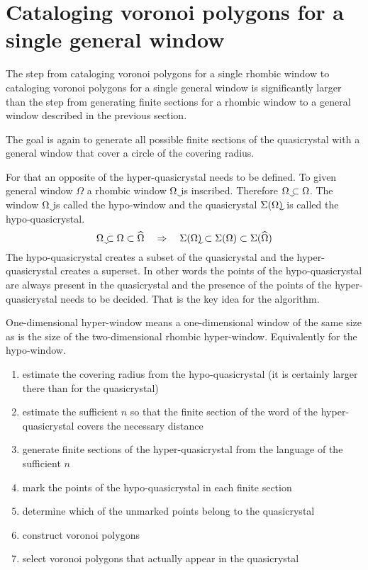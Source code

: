 \documentclass[text.tex]{subfiles}
\begin{document}
\section{Cataloging voronoi polygons for a single general window}
The step from cataloging voronoi polygons for a single rhombic window to cataloging voronoi polygons for a single general window is significantly larger than the step from generating finite sections for a rhombic window to a general window described in the previous section. 

The goal is again to generate all possible finite sections of the quasicrystal with a general window that cover a circle of the covering radius. 

For that an opposite of the hyper-quasicrystal needs to be defined. To given general window $\Omega$ a rhombic window $\uwidehat{\Omega}$ is inscribed. Therefore $\uwidehat{\Omega}\subset\Omega$. The window $\uwidehat{\Omega}$ is called the hypo-window and the quasicrystal $\quasi{\uwidehat{\Omega}}$ is called the hypo-quasicrystal. 
$$\uwidehat{\Omega}\subset\Omega\subset\widehat{\Omega} \quad \Rightarrow \quad \quasi{\uwidehat{\Omega}}\subset\quasi{\Omega}\subset\quasi{\widehat{\Omega}}$$
The hypo-quasicrystal creates a subset of the quasicrystal and the hyper-quasicrystal creates a superset. In other words the points of the hypo-quasicrystal are always present in the quasicrystal and the presence of the points of the hyper-quasicrystal needs to be decided. That is the key idea for the algorithm. 

\begin{remark}
One-dimensional hyper-window means a one-dimensional window of the same size as is the size of the two-dimensional rhombic hyper-window. Equivalently for the hypo-window. 
\end{remark}

\begin{enumerate}
\item estimate the covering radius from the hypo-quasicrystal (it is certainly larger there than for the quasicrystal)
\item estimate the sufficient $n$ so that the finite section of the word of the hyper-quasicrystal covers the necessary distance
\item generate finite sections of the hyper-quasicrystal from the language of the sufficient $n$
\item mark the points of the hypo-quasicrystal in each finite section
\item determine which of the unmarked points belong to the quasicrystal
\item construct voronoi polygons
\item select voronoi polygons that actually appear in the quasicrystal
\end{enumerate}
\end{document}
